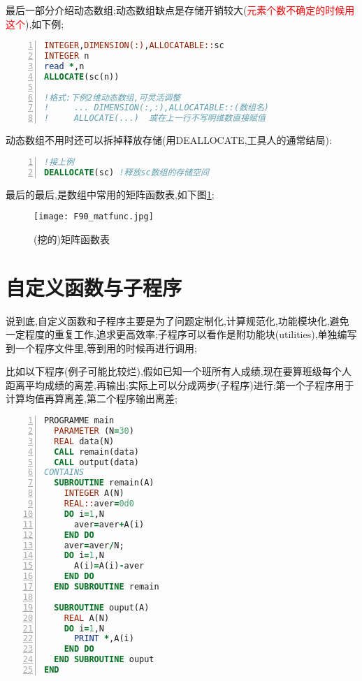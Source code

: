 最后一部分介绍动态数组;动态数组缺点是存储开销较大(\textcolor{red}{元素个数不确定的时候用这个}),如下例;

\begin{lstlisting}[numbers=left,frame=single,language=Fortran]
INTEGER,DIMENSION(:),ALLOCATABLE::sc
INTEGER n
read *,n
ALLOCATE(sc(n))

!格式:下例2维动态数组,可灵活调整
!     ... DIMENSION(:,:),ALLOCATABLE::(数组名)
!     ALLOCATE(...)  或在上一行不写明维数直接赋值
\end{lstlisting}
\par

动态数组不用时还可以拆掉释放存储(用DEALLOCATE,工具人的通常结局):
\begin{lstlisting}[numbers=left,frame=single,language=Fortran]
!接上例
DEALLOCATE(sc) !释放sc数组的存储空间
\end{lstlisting}
\par

最后的最后,是数组中常用的矩阵函数表,如下图\ref{F90-matfunc};

\begin{figure}[h]
	\noindent
	\centering
	\texttt{[image: F90\_matfunc.jpg]}
	\caption{(挖的)矩阵函数表}
	\label{F90-matfunc}
\end{figure}



\section{自定义函数与子程序}

说到底,自定义函数和子程序主要是为了问题定制化,计算规范化,功能模块化,避免一定程度的重复工作,追求更高效率;子程序可以看作是附功能块(utilities),单独编写到一个程序文件里,等到用的时候再进行调用;\par

比如以下程序(例子可能比较烂),假如已知一个班所有人成绩,现在要算班级每个人距离平均成绩的离差,再输出;实际上可以分成两步(子程序)进行;第一个子程序用于计算均值再算离差,第二个程序输出离差;
\begin{lstlisting}[numbers=left,frame=single,language=Fortran]
PROGRAMME main
  PARAMETER (N=30)
  REAL data(N)
  CALL remain(data)
  CALL output(data)
CONTAINS
  SUBROUTINE remain(A)
    INTEGER A(N)
    REAL::aver=0d0
    DO i=1,N
      aver=aver+A(i)
    END DO
    aver=aver/N;
    DO i=1,N
      A(i)=A(i)-aver
    END DO
  END SUBROUTINE remain
  
  SUBROUTINE ouput(A)
    REAL A(N)
    DO i=1,N
      PRINT *,A(i)
    END DO
  END SUBROUTINE ouput
END
\end{lstlisting}
\par

